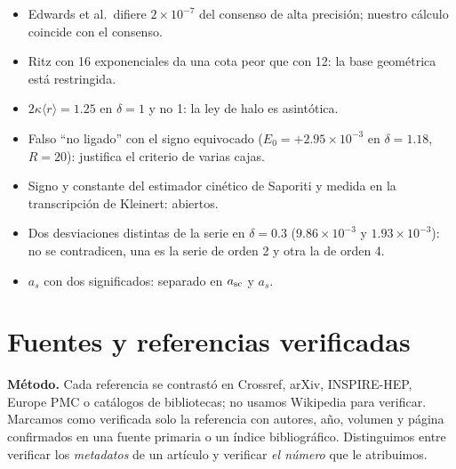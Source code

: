 \documentclass[11pt]{article}
\begin{document}
\begin{itemize}
\item Edwards et al.\ difiere $2\times10^{-7}$ del consenso de alta precisión; nuestro cálculo coincide con el consenso.
\item Ritz con 16 exponenciales da una cota peor que con 12: la base geométrica está restringida.
\item $2\kappa\langle r\rangle=1.25$ en $\delta=1$ y no 1: la ley de halo es asintótica.
\item Falso ``no ligado'' con el signo equivocado ($E_0=+2.95\times10^{-3}$ en $\delta=1.18$, $R=20$): justifica el criterio de varias cajas.
\item Signo y constante del estimador cinético de Saporiti y medida en la transcripción de Kleinert: abiertos.
\item Dos desviaciones distintas de la serie en $\delta=0.3$ ($9.86\times10^{-3}$ y $1.93\times10^{-3}$): no se contradicen, una es la serie de orden 2 y otra la de orden 4.
\item $a_s$ con dos significados: separado en $a_{\rm sc}$ y $a_s$.
\end{itemize}

\section{Fuentes y referencias verificadas}
\label{sec:fuentes}

\textbf{Método.} Cada referencia se contrastó en Crossref, arXiv, INSPIRE-HEP, Europe PMC o catálogos de bibliotecas; no usamos Wikipedia para verificar. Marcamos como verificada solo la referencia con autores, año, volumen y página confirmados en una fuente primaria o un índice bibliográfico. Distinguimos entre verificar los \emph{metadatos} de un artículo y verificar \emph{el número} que le atribuimos.
\end{document}
